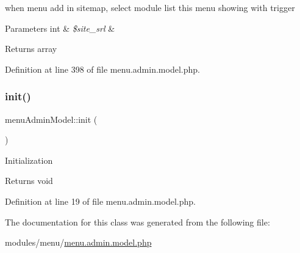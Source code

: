 when menu add in sitemap, select module list this menu showing with trigger 


\begin{DoxyParams}[1]{Parameters}
int & {\em \$site\+\_\+srl} & \\
\hline
\end{DoxyParams}
\begin{DoxyReturn}{Returns}
array 
\end{DoxyReturn}


Definition at line 398 of file menu.\+admin.\+model.\+php.

\hypertarget{classmenuAdminModel_a092a0da21ac0c7f76f84ec5be5eea1b7}{}\label{classmenuAdminModel_a092a0da21ac0c7f76f84ec5be5eea1b7} 
\subsubsection{\texorpdfstring{init()}{init()}}
{\footnotesize\ttfamily menu\+Admin\+Model\+::init (\begin{DoxyParamCaption}{ }\end{DoxyParamCaption})}

Initialization \begin{DoxyReturn}{Returns}
void 
\end{DoxyReturn}


Definition at line 19 of file menu.\+admin.\+model.\+php.



The documentation for this class was generated from the following file\+:\begin{DoxyCompactItemize}
\item 
modules/menu/\hyperlink{menu_8admin_8model_8php}{menu.\+admin.\+model.\+php}\end{DoxyCompactItemize}
